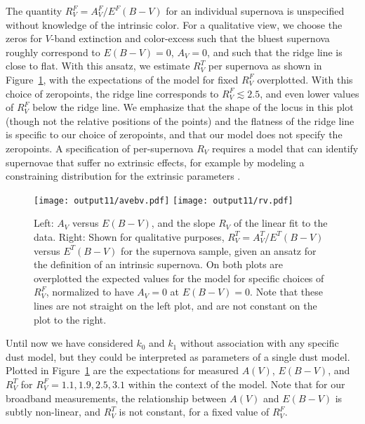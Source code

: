 \documentclass{aastex61}   	%
\begin{document}
The quantity $R^F_V = A^F_V/E^F(B-V)$ for an individual supernova is unspecified without knowledge of the intrinsic color.
For a qualitative view, we choose the zeros for $V$-band extinction and color-excess such that the bluest supernova roughly correspond to $E(B-V)=0$,
$A_V=0$, and such that the ridge line is close to flat.
With this ansatz, we
estimate $R^T_V$ per supernova as shown in Figure~\ref{avebv:fig}, with the expectations of the
  model for fixed $R^F_V$ overplotted.
With this choice of zeropoints, the ridge line corresponds to $R_V^F\lesssim 2.5$, and even lower values of $R_V^F$ below the ridge line.
We emphasize that the shape of the locus in this plot (though not the relative positions of the points)  and the flatness
of the ridge line is specific to our choice of zeropoints, and that our model does not specify the zeropoints.
A specification of per-supernova $R_V$ requires a model that can identify supernovae that suffer no extrinsic effects,
for example by modeling  a constraining distribution for the extrinsic parameters \citep{2016arXiv160904470M}.
\color{black}

\begin{figure}[htbp] %
   \centering
   \texttt{[image: output11/avebv.pdf]}
   \texttt{[image: output11/rv.pdf]}
   \caption{
	\color{red}
   Left: $A_V$ versus $E(B-V)$, and the slope $R_V$ of the linear fit to the data. Right: Shown for qualitative purposes,
   $R^T_V=A^T_V/E^T(B-V)$ 
   versus $E^T(B-V)$ for the supernova sample, given an ansatz for the definition of an intrinsic supernova. 
   On both plots are overplotted the expected values for the  model
   for specific choices of $R^F_V$, normalized to have $A_V=0$ at $E(B-V)=0$.  Note that these lines are not straight on the left plot, and are not constant on the plot to the right.
   \color{black}
   \label{avebv:fig}}
\end{figure}


Until now we have considered $k_0$ and $k_1$ without association with any specific dust model, but they could be interpreted as
parameters of a single  dust model.
\color{red}
Plotted in Figure~\ref{avebv:fig} are the expectations for measured $A(V)$, $E(B-V)$, and $R^T_V$ for $R^F_V=1.1, 1.9, 2.5, 3.1$
within the context of the  model.
Note that for our broadband measurements, the relationship between $A(V)$ and $E(B-V)$ is subtly
non-linear, and $R^T_V$ is not constant, for a fixed value of $R^F_V$.
\color{black}
\end{document}
